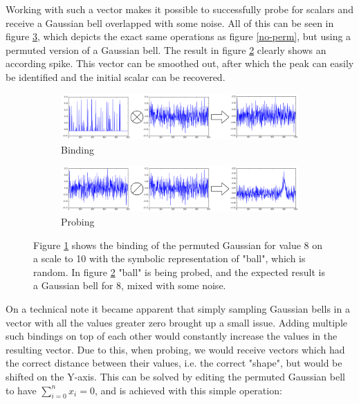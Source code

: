 \documentclass[conference]{IEEEtran}
\begin{document}
	Working with such a vector makes it possible to successfully probe for scalars and receive a Gaussian bell overlapped with some noise.
All of this can be seen in figure \ref{perm}, which depicts the exact same operations as figure \ref{no-perm}, but using a permuted version of a Gaussian bell.
The result in figure \ref{perm-b} clearly shows an according spike.
This vector can be smoothed out, after which the peak can easily be identified and the initial scalar can be recovered.
	
	\begin{figure}
		\begin{subfigure}{1\columnwidth}
			\includegraphics[width=\columnwidth]{img/scalar-post-perm.png}
			\caption{Binding}
			\label{perm-a}
		\end{subfigure}
		\begin{subfigure}{1\columnwidth}
			\includegraphics[width=\columnwidth]{img/scalar-post-perm-probe.png}
			\caption{Probing}
			\label{perm-b}
		\end{subfigure}
		\caption{Figure \ref{perm-a} shows the binding of the permuted Gaussian for value 8 on a scale to 10 with the symbolic representation of "ball", which is random.
In figure \ref{perm-b} "ball" is being probed, and the expected result is a Gaussian bell for 8, mixed with some noise.}
		\label{perm}
	\end{figure}
	
	On a technical note it became apparent that simply sampling Gaussian bells in a vector with all the values greater zero brought up a small issue.
Adding multiple such bindings on top of each other would constantly increase the values in the resulting vector.
Due to this, when probing, we would receive vectors which had the correct distance between their values, i.e.
the correct "shape", but would be shifted on the Y-axis.
This can be solved by editing the permuted Gaussian bell to have \(\sum_{i=0}^n x_i = 0\), and is achieved with this simple operation:
	
\end{document}
